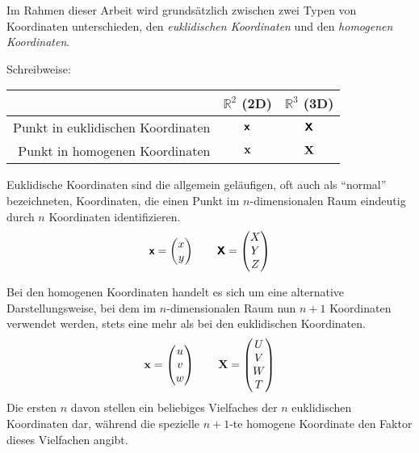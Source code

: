 

Im Rahmen dieser Arbeit wird grundsätzlich zwischen zwei Typen von Koordinaten unterschieden, den \emph{euklidischen Koordinaten} und den \emph{homogenen Koordinaten}.\kleinerabstand

\noindent Schreibweise:\qquad
\begin{tabular}{r|c|c}
	& $\mathbb{R}^2$ (2D) & $\mathbb{R}^3$ (3D) \\ \hline
	Punkt in euklidischen Koordinaten & $\boldsymbol{\mathsf{x}}$ & $\boldsymbol{\mathsf{X}}$ \\ \hline
	Punkt in homogenen Koordinaten & $\boldsymbol{\mathrm{x}}$ & $\boldsymbol{\mathrm{X}}$ \\ \hline
\end{tabular}\mittelgrosserabstand

Euklidische Koordinaten sind die allgemein geläufigen, oft auch als ``normal'' bezeichneten, Koordinaten, die einen Punkt im $n$-dimensionalen Raum eindeutig durch $n$ Koordinaten identifizieren. 
\begin{equation}
	\boldsymbol{\mathsf{x}} = \begin{pmatrix}x\\y\\\end{pmatrix} \qquad \boldsymbol{\mathsf{X}} = \begin{pmatrix}X\\Y\\Z\\\end{pmatrix}
\end{equation}

Bei den homogenen Koordinaten handelt es sich um eine alternative Darstellungsweise, bei dem im $n$-dimensionalen Raum nun $n+1$ Koordinaten verwendet werden, stets eine mehr als bei den euklidischen Koordinaten.
\begin{equation}
	\boldsymbol{\mathrm{x}} = \begin{pmatrix}u\\v\\w\\\end{pmatrix} \qquad \boldsymbol{\mathrm{X}} = \begin{pmatrix}U\\V\\W\\T\\\end{pmatrix}
\end{equation}
Die ersten $n$ davon stellen ein beliebiges Vielfaches der $n$ euklidischen Koordinaten dar, während die spezielle $n{+}1$-te homogene Koordinate den Faktor dieses Vielfachen angibt.

